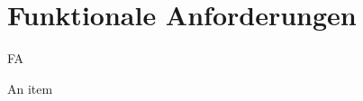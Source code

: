 \section{Funktionale Anforderungen}

\setcounter{counter}{10}
\begin{Kriterien}{FA}
    \item An item
\end{Kriterien}